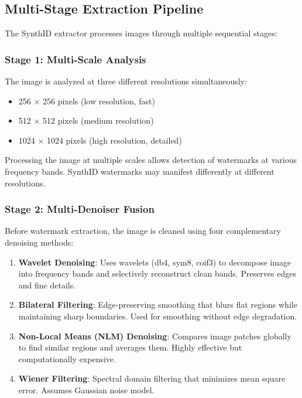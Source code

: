 \documentclass[12pt,a4paper]{book}
\begin{document}
\subsection{Multi-Stage Extraction Pipeline}
\label{subsec:synthid-pipeline}

The SynthID extractor processes images through multiple sequential stages:

\subsubsection{Stage 1: Multi-Scale Analysis}
The image is analyzed at three different resolutions simultaneously:
\begin{itemize}
    \item 256 × 256 pixels (low resolution, fast)
    \item 512 × 512 pixels (medium resolution)
    \item 1024 × 1024 pixels (high resolution, detailed)
\end{itemize}

Processing the image at multiple scales allows detection of watermarks at various frequency bands. SynthID watermarks may manifest differently at different resolutions.

\subsubsection{Stage 2: Multi-Denoiser Fusion}
Before watermark extraction, the image is cleaned using four complementary denoising methods:

\begin{enumerate}
    \item \textbf{Wavelet Denoising}: Uses wavelets (db4, sym8, coif3) to decompose image into frequency bands and selectively reconstruct clean bands. Preserves edges and fine details.
    
    \item \textbf{Bilateral Filtering}: Edge-preserving smoothing that blurs flat regions while maintaining sharp boundaries. Used for smoothing without edge degradation.
    
    \item \textbf{Non-Local Means (NLM) Denoising}: Compares image patches globally to find similar regions and averages them. Highly effective but computationally expensive.
    
    \item \textbf{Wiener Filtering}: Spectral domain filtering that minimizes mean square error. Assumes Gaussian noise model.
\end{enumerate}
\end{document}
